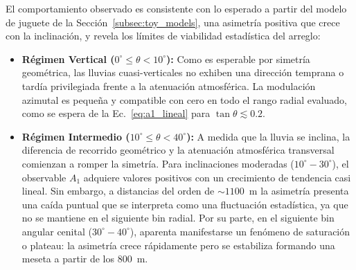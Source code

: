 El comportamiento observado es consistente con lo esperado a partir del modelo de juguete de la Sección~\ref{subsec:toy_models}, una asimetría positiva que crece con la inclinación, y revela los límites de viabilidad estadística del arreglo:

\begin{itemize}
	\item \textbf{Régimen Vertical ($0^\circ \leq \theta < 10^\circ$):} Como es esperable por simetría geométrica, las lluvias cuasi-verticales no exhiben una dirección temprana o tardía privilegiada frente a la atenuación atmosférica. %
La modulación azimutal es pequeña y compatible con cero en todo el rango radial evaluado, como se espera de la Ec.~\ref{eq:a1_lineal} para $\tan\theta \lesssim 0.2$.
	
	\item \textbf{Régimen Intermedio ($10^\circ \leq \theta < 40^\circ$):} A medida que la lluvia se inclina, la diferencia de recorrido geométrico y la atenuación atmosférica transversal comienzan a romper la simetría. Para inclinaciones moderadas ($10^\circ - 30^\circ$), el observable $A_1$ adquiere valores positivos con un crecimiento de tendencia casi lineal. %
Sin embargo, a distancias del orden de $\sim 1100$~m la asimetría presenta una caída puntual que se interpreta como una fluctuación estadística, ya que no se mantiene en el siguiente bin radial. Por su parte, en el siguiente bin angular cenital ($30^\circ - 40^\circ$), aparenta manifestarse un fenómeno de saturación o plateau: la asimetría crece rápidamente pero se estabiliza formando una meseta a partir de los $800$~m.
	

\end{itemize}
